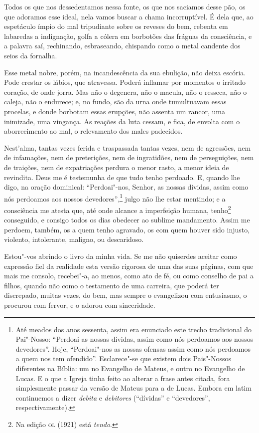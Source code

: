 Todos os que nos dessedentamos nessa fonte, os que nos saciamos
desse pão, os que adoramos esse ideal, nela vamos buscar a chama
incorruptível. É dela que, ao espetáculo ímpio do mal tripudiante sobre
os reveses do bem, rebenta em labaredas a indignação, golfa a cólera em
borbotões das fráguas da consciência, e a palavra saí, rechinando,
esbraseando, chispando como o metal candente dos seios da fornalha.

Esse metal nobre, porém, na incandescência da sua ebulição, não
deixa escória. Pode crestar os lábios, que atravessa. Poderá inflamar
por momentos o irritado coração, de onde jorra. Mas não o degenera, não
o macula, não o resseca, não o caleja, não o endurece; e, no fundo, são
da urna onde tumultuavam essas procelas, e donde borbotam essas
erupções, não assenta um rancor, uma inimizade, uma vingança. As
reações da luta cessam, e fica, de envolta com o aborrecimento ao mal,
o relevamento dos males padecidos.

Nest'alma, tantas vezes ferida e traspassada
tantas vezes, nem de agressões, nem de infamações, nem de preterições,
nem de ingratidões, nem de perseguições, nem de traições, nem de
expatriações perdura o menor rasto, a menor ideia de revindita. Deus me
é testemunha de que tudo tenho perdoado. E, quando lhe digo, na oração
dominical: ``Perdoai"-nos, Senhor, as nossas dívidas, assim
como nós perdoamos aos nossos devedores'',\footnote{ Até
meados dos anos sessenta, assim era enunciado este trecho tradicional
do  Pai"-Nosso: ``Perdoai as nossas dívidas, assim como nós perdoamos aos
nossos devedores''. Hoje, ``Perdoai"-nos as nossas ofensas assim como nós
perdoamos a quem nos tem ofendido''. Esclarece"-se que existem dois
Pais"-Nossos diferentes na Bíblia: um no Evangelho de Mateus, e outro no
Evangelho de Lucas. E o que a Igreja tinha feito ao alterar a frase
antes citada, fora simplesmente passar da versão de Mateus para a de
Lucas. Embora em latim continuemos a dizer \textit{debita} e
\textit{debitores} (“dívidas” e “devedores”, respectivamente).}
julgo não lhe estar mentindo; e a consciência me atesta que, até onde
alcance a imperfeição humana, tenho\footnote{ Na edição \textsc{ol} (1921) está
\textit{tendo}. } conseguido, e consigo todos os dias obedecer ao
sublime mandamento. Assim me perdoem, também, os a quem tenho agravado,
os com quem houver sido injusto, violento, intolerante, maligno, ou
descaridoso.

Estou"-vos abrindo o livro da minha vida. Se me não quiserdes
aceitar como expressão fiel da realidade esta versão rigorosa de uma
das suas páginas, com que mais me consolo, recebei"-a, ao menos, como
ato de fé, ou como conselho de pai a filhos, quando não como o
testamento de uma carreira, que poderá ter discrepado, muitas vezes, do
bem, mas sempre o evangelizou com entusiasmo, o procurou com fervor, e
o adorou com sinceridade.

